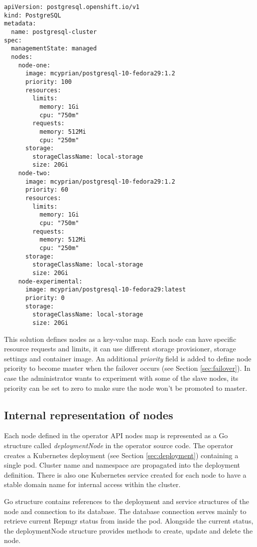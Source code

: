 \documentclass[
  digital, %
  twoside, %
  table,   %
  nolof,   %
  nolot,   %
]{fithesis3}
\begin{document}
\begin{lstlisting}
apiVersion: postgresql.openshift.io/v1
kind: PostgreSQL
metadata:
  name: postgresql-cluster
spec:
  managementState: managed
  nodes:
    node-one:
      image: mcyprian/postgresql-10-fedora29:1.2
      priority: 100
      resources:
        limits:
          memory: 1Gi
          cpu: "750m"
        requests:
          memory: 512Mi
          cpu: "250m"
      storage:
        storageClassName: local-storage
        size: 20Gi
    node-two:
      image: mcyprian/postgresql-10-fedora29:1.2
      priority: 60
      resources:
        limits:
          memory: 1Gi
          cpu: "750m"
        requests:
          memory: 512Mi
          cpu: "250m"
      storage:
        storageClassName: local-storage
        size: 20Gi
    node-experimental:
      image: mcyprian/postgresql-10-fedora29:latest
      priority: 0
      storage:
        storageClassName: local-storage
        size: 20Gi
\end{lstlisting}

This solution defines nodes as a key-value map. Each node can have specific resource requests and limits, it can use different storage provisioner,  storage settings and container image. An additional \textit{priority} field is added to define node priority to become master when the failover occurs (see Section \ref{sec:failover}). In case the administrator wants to experiment with some of the slave nodes, its priority can be set to zero to make sure the node won't be promoted to master.

\subsection{Internal representation of nodes}
 Each node defined in the operator API nodes map is represented as a Go structure called \textit{deploymentNode} in the operator source code. The operator creates a Kubernetes deployment (see Section \ref{sec:deployment}) containing a single pod. Cluster name and namespace are propagated into the deployment definition. There is also one Kubernetes service created for each node to have a stable domain name for internal access within the cluster.

 Go structure contains references to the deployment and service structures of the node and connection to its database. The database connection serves mainly to retrieve current Repmgr status from inside the pod. Alongside the current status, the deploymentNode structure provides methods to create, update and delete the node.
\end{document}
